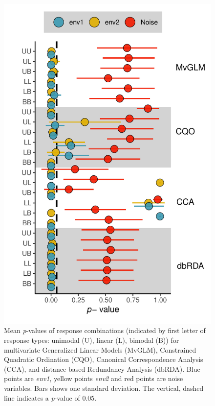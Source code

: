     \begin{figure}
        \centering
        \includegraphics[scale = 0.7]{figures/190912_error_bar.pdf}
        \caption{Mean \textit{p}-values of response combinations (indicated by first letter of response types: unimodal (U), linear (L), bimodal (B)) for multivariate Generalized Linear Models (MvGLM), Constrained Quadratic Ordination (CQO), Canonical Correspondence Analysis (CCA), and distance-based Redundancy Analysis (dbRDA). Blue points are \textit{env1}, yellow points \textit{env2} and red points are noise variables. Bars shows one standard deviation. The vertical, dashed line indicates a \textit{p}-value of 0.05.}
        \label{fig:result1::p-valueComparison}
    \end{figure}

